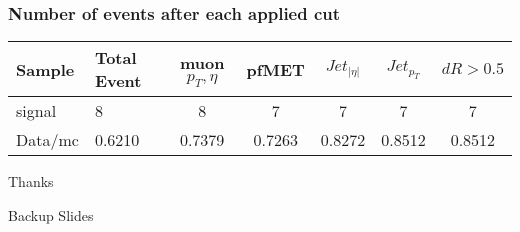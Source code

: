    \begin{center}
    \end{center}
    
\begin{frame}[shrink]\frametitle{Number of events after each applied cut}
{\scriptsize \begin{tabular}{|p{1.5cm}|p{1cm}|c|c|c|c|c|}
    	\hline
	Sample & Total Event  & muon $p_T, \eta$ & pfMET & $Jet_{|\eta|}$ &  $Jet_{p_T}$  & $dR>0.5$\\
	\hline
	\hline
	signal & 8 & 8 & 7 & 7  & 7 & 7\\
	\hline
	Data/mc & 0.6210 & 0.7379 & 0.7263 & 0.8272 & 0.8512 & 0.8512\\
	\hline
\end{tabular}
}
\end{frame}

\begin{frame}[c]
	\begin{center}
	\Huge Thanks
	\end{center}
\end{frame}

\begin{frame}[c]
	\begin{center}
	\Huge Backup Slides
	\end{center}
\end{frame}



